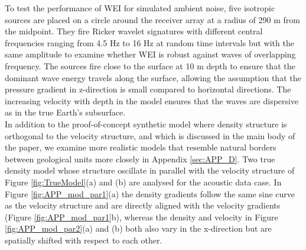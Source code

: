 \documentclass{article}
\begin{document}
	To test the performance of WEI for simulated ambient noise, five isotropic sources are placed on a circle around the receiver array at a radius of 290 m from the midpoint. They fire Ricker wavelet signatures with different central frequencies ranging from 4.5 Hz to 16 Hz at random time intervals but with the same amplitude to examine whether WEI is robust against waves of overlapping frequency. The sources fire close to the surface at 10 m depth to ensure that the dominant wave energy travels along the surface, allowing the assumption that the pressure gradient in z-direction is small compared to horizontal directions. The increasing velocity with depth in the model ensures that the waves are dispersive as in the true Earth's subsurface.\\
	
	
	In addition to the proof-of-concept synthetic model where density structure is orthogonal to the velocity structure, and which is discussed in the main body of the paper, we examine more realistic models that resemble natural borders between geological units more closely in Appendix \ref{sec:APP_D}. Two true density model whose structure oscillate in parallel with the velocity structure of Figure \ref{fig:TrueModel}(a) and (b) are analysed for the acoustic data case.  In Figure \ref{fig:APP_mod_par1}(a) the density gradients follow the same sine curve as the velocity structure and are directly aligned with the velocity gradients (Figure \ref{fig:APP_mod_par1}b), whereas the density and velocity in Figure \ref{fig:APP_mod_par2}(a) and (b) both also vary in the x-direction but are spatially shifted with respect to each other.

	
	
\end{document}

